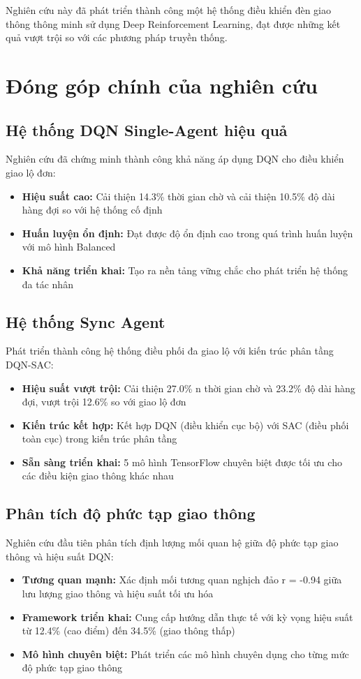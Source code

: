 Nghiên cứu này đã phát triển thành công một hệ thống điều khiển đèn giao thông thông minh sử dụng Deep Reinforcement Learning, đạt được những kết quả vượt trội so với các phương pháp truyền thống.

\section{Đóng góp chính của nghiên cứu}

\subsection{Hệ thống DQN Single-Agent hiệu quả}
Nghiên cứu đã chứng minh thành công khả năng áp dụng DQN cho điều khiển giao lộ đơn:
\begin{itemize}
    \item \textbf{Hiệu suất cao:} Cải thiện 14.3\% thời gian chờ và cải thiện 10.5\% độ dài hàng đợi so với hệ thống cố định
    \item \textbf{Huấn luyện ổn định:} Đạt được độ ổn định cao trong quá trình huấn luyện với mô hình Balanced
    \item \textbf{Khả năng triển khai:} Tạo ra nền tảng vững chắc cho phát triển hệ thống đa tác nhân
\end{itemize}

\subsection{Hệ thống Sync Agent}
Phát triển thành công hệ thống điều phối đa giao lộ với kiến trúc phân tầng DQN-SAC:
\begin{itemize}
    \item \textbf{Hiệu suất vượt trội:} Cải thiện 27.0\% n thời gian chờ và 23.2\% độ dài hàng đợi, vượt trội 12.6\% so với giao lộ đơn
    \item \textbf{Kiến trúc kết hợp:} Kết hợp DQN (điều khiển cục bộ) với SAC (điều phối toàn cục) trong kiến trúc phân tầng
    \item \textbf{Sẵn sàng triển khai:} 5 mô hình TensorFlow chuyên biệt được tối ưu cho các điều kiện giao thông khác nhau
\end{itemize}

\subsection{Phân tích độ phức tạp giao thông}
Nghiên cứu đầu tiên phân tích định lượng mối quan hệ giữa độ phức tạp giao thông và hiệu suất DQN:
\begin{itemize}
    \item \textbf{Tương quan mạnh:} Xác định mối tương quan nghịch đảo r = -0.94 giữa lưu lượng giao thông và hiệu suất tối ưu hóa
    \item \textbf{Framework triển khai:} Cung cấp hướng dẫn thực tế với kỳ vọng hiệu suất từ 12.4\% (cao điểm) đến 34.5\% (giao thông thấp)
    \item \textbf{Mô hình chuyên biệt:} Phát triển các mô hình chuyên dụng cho từng mức độ phức tạp giao thông
\end{itemize}



